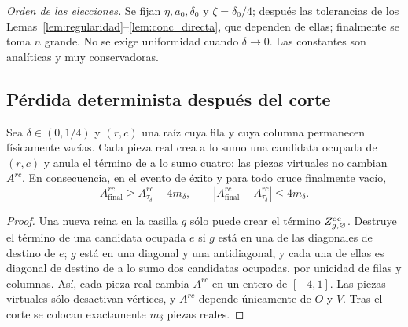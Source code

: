 \emph{Orden de las elecciones.} Se fijan $\eta,a_0,\delta_0$ y $\zeta=\delta_0/4$; después las tolerancias
de los
Lemas~\ref{lem:regularidad}--\ref{lem:conc_directa}, que dependen de ellas; finalmente se toma
$n$ grande. No se exige uniformidad cuando $\delta\to0$. Las constantes son analíticas y muy
conservadoras.

\subsection{Pérdida determinista después del corte}

\begin{lema}\label{lem:perdida}
Sea $\delta\in(0,1/4)$ y $(r,c)$ una raíz cuya fila y cuya columna permanecen físicamente vacías. Cada pieza
real
crea a lo sumo una candidata ocupada de $(r,c)$ y anula el término de a lo sumo cuatro; las piezas
virtuales no cambian $A^{rc}$. En consecuencia, en el evento de éxito y para todo cruce
finalmente vacío,
\[
 A^{rc}_{\mathrm{final}}\ge A^{rc}_{\tau_\delta}-4m_\delta,\qquad
 |A^{rc}_{\mathrm{final}}-A^{rc}_{\tau_\delta}|\le4m_\delta .
\]
\end{lema}

\begin{proof}
Una nueva reina en la casilla $g$ sólo puede crear el término $Z^{\mathrm{oc}}_{g,\varnothing}$. Destruye
el término de una candidata ocupada $e$ si $g$ está en una de las diagonales de destino de $e$;
$g$ está en una diagonal y una antidiagonal, y cada una de ellas es diagonal de destino de a lo
sumo dos candidatas ocupadas, por unicidad de filas y columnas. Así, cada pieza real cambia
$A^{rc}$ en un entero de $[-4,1]$. Las piezas virtuales sólo
desactivan vértices, y $A^{rc}$ depende únicamente de $O$ y $V$. Tras el corte se colocan
exactamente $m_\delta$ piezas reales.
\end{proof}
